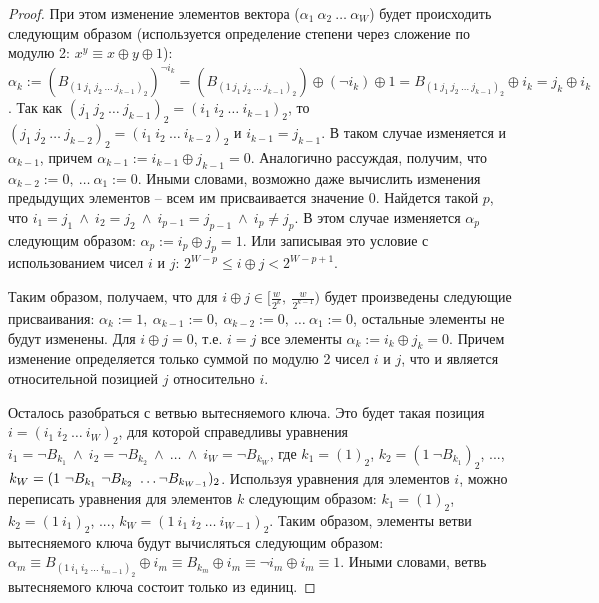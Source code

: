 \begin{proof}
  При этом изменение элементов вектора
  ($\alpha_1~\alpha_2~\dots~\alpha_W$) будет происходить следующим  образом (используется определение степени через сложение по модулю 2: $x^y \equiv x \oplus y \oplus 1$): $\alpha_k :=
  (B_{(1~j_1~j_2~\dots~j_{k-1})_2})^{\neg i_k} =
  (B_{(1~j_1~j_2~\dots~j_{k-1})_2}) \oplus (\neg i_k) \oplus 1 =
  B_{(1~j_1~j_2~\dots~j_{k-1})_2} \oplus i_k = j_k \oplus i_k$. Так как $(j_1~j_2~\dots~j_{k-1})_2 = (i_1~i_2~\dots~i_{k-1})_2$, то $(j_1~j_2~\dots~j_{k-2})_2 = (i_1~i_2~\dots~i_{k-2})_2$ и $i_{k-1} = j_{k-1}$. В таком случае изменяется и $\alpha_{k-1}$, причем $\alpha_{k-1} := i_{k-1} \oplus j_{k-1} = 0$. Аналогично
  рассуждая, получим, что $\alpha_{k-2} := 0,~\dots~\alpha_1 := 0$.
  Иными словами, возможно даже вычислить изменения предыдущих
  элементов -- всем им присваивается значение 0. Найдется такой $p$,
  что $i_1 = j_1~\wedge~i_2 = j_2~\wedge~i_{p-1} =
  j_{p-1}~\wedge~i_p \neq j_p$. В этом случае изменяется
  $\alpha_p$ следующим образом: $\alpha_p := i_p \oplus j_p = 1$.
  Или записывая это условие с использованием чисел $i$ и $j$: $2^{W-p} \leqslant i
  \oplus j < 2^{W-p+1}$.

  Таким образом, получаем, что для $i \oplus j \in
  [\frac{w}{2^k},~\frac{w}{2^{k-1}})$ будет произведены следующие
  присваивания: $\alpha_k := 1,~\alpha_{k-1} := 0,~\alpha_{k-2} :=
  0,~\dots~\alpha_1 := 0$, остальные элементы не будут изменены. Для
  $i \oplus j = 0$, т.е. $i = j$ все элементы $\alpha_k := i_k \oplus
  j_k = 0$. Причем изменение определяется только суммой по модулю 2
  чисел $i$ и $j$, что и является относительной позицией $j$
  относительно $i$.

  Осталось разобраться с ветвью вытесняемого ключа. Это будет такая
  позиция $i = (i_1~i_2~\dots~i_W)_2$, для которой справедливы
  уравнения $i_1 = \neg B_{k_1}~\wedge~i_2 = \neg
  B_{k_2}~\wedge~\dots~\wedge~i_W = \neg B_{k_W}$, где $k_1 = (1)_2$,
  $k_2 = (1~\neg B_{k_1})_2$, ..., $k_W = (1~\neg B_{k_1}~\neg
  B_{k_2}~\dots\\\neg B_{k_{W-1}})_2$. Используя уравнения для
  элементов $i$, можно переписать уравнения для элементов $k$
  следующим образом: $k_1 = (1)_2$,
  $k_2 = (1~i_1)_2$, ..., $k_W = (1~i_1~i_2~\dots~i_{W-1})_2$. Таким
  образом, элементы ветви вытесняемого ключа будут вычисляться
  следующим образом: $\alpha_m \equiv B_{(1~i_1~i_2~\dots~i_{m-1})_2}
  \oplus i_m \equiv B_{k_m} \oplus i_m \equiv \neg i_m \oplus i_m
  \equiv 1$. Иными словами, ветвь вытесняемого ключа состоит только
  из единиц.
\end{proof}

